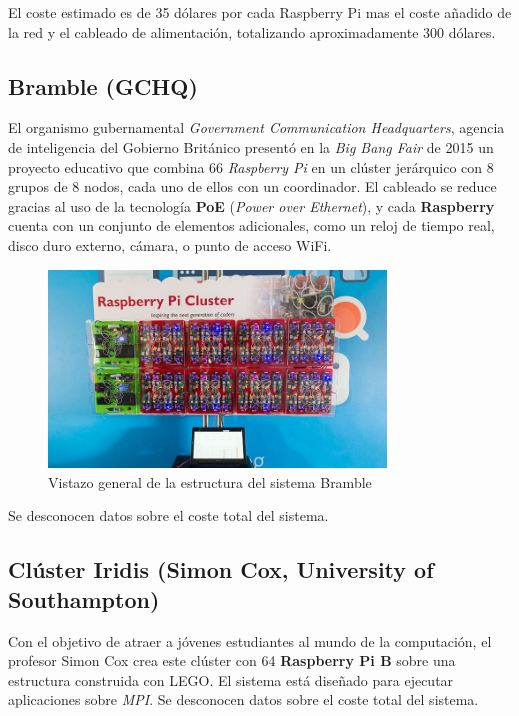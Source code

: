 El coste estimado es de 35 dólares por cada Raspberry Pi mas el coste añadido de la red y el cableado de alimentación, totalizando aproximadamente 300 dólares.

\subsection{Bramble (GCHQ)}

El organismo gubernamental \textit{Government Communication Headquarters}, agencia de inteligencia del Gobierno Británico presentó en la \textit{Big Bang Fair} de 2015 un proyecto educativo que combina 66 \textit{Raspberry Pi} en un clúster jerárquico con 8 grupos de 8 nodos, cada uno de ellos con un coordinador. El cableado se reduce gracias al uso de la tecnología \textbf{PoE} (\textit{Power over Ethernet}), y cada \textbf{Raspberry} cuenta con un conjunto de elementos adicionales, como un reloj de tiempo real, disco duro externo, cámara, o punto de acceso WiFi\cite{gchqbramble}.

\begin{figure}[H]
  \centering
  \includegraphics[width=0.8\textwidth]{Chapters/Chapter3/Figures/bramblegchq}
  \caption[Bramble]{Vistazo general de la estructura del sistema Bramble}
  \label{gchq:bramble}
\end{figure}

Se desconocen datos sobre el coste total del sistema.

\subsection{Clúster Iridis (Simon Cox, University of Southampton)}

Con el objetivo de atraer a jóvenes estudiantes al mundo de la computación, el profesor Simon Cox crea este clúster con 64 \textbf{Raspberry Pi B} sobre una estructura construida con LEGO\cite{cox:raspberry}. El sistema está diseñado para ejecutar aplicaciones sobre \textit{MPI}. Se desconocen datos sobre el coste total del sistema.

